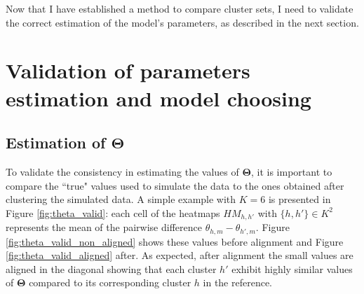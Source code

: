 Now that I have established a method to compare cluster sets, I need to validate the correct estimation of the model's parameters, as described in the next section.


\section{Validation of parameters estimation and model choosing}
	\subsection{Estimation of $\boldsymbol{\Theta}$}
	To validate the consistency in estimating the values of $\boldsymbol{\Theta}$, it is important to compare the ``true" values used to simulate the data to the ones obtained after clustering the simulated data.
	A simple example with $K=6$ is presented in Figure \ref{fig:theta_valid}: each cell of the heatmaps $HM_{h,h'}$ with $\{h,h'\} \in K^2$ represents the mean of the pairwise difference $\theta_{h,m} - \theta_{h',m}$. Figure \ref{fig:theta_valid_non_aligned} shows these values before alignment and Figure \ref{fig:theta_valid_aligned} after. As expected, after alignment the small values are aligned in the diagonal showing that each cluster $h'$ exhibit highly similar values of $\boldsymbol{\Theta}$ compared to its corresponding cluster $h$ in the reference.\\
	 
